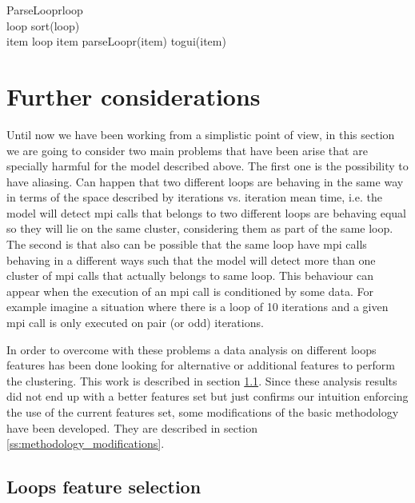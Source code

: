 \begin{pseudocode}{ParseLoopr}{loop}
\label{pc:parse_loop_func}
     \\
    loop \GETS sort(loop) \\

    \FORALL item \in loop \DO
    \BEGIN
        \IF item \in \Upsilon \THEN
            parseLoopr(item)
        \ELSE
            togui(item)
    \END
\end{pseudocode}

\section{Further considerations}\label{s:further_considerations}

Until now we have been working from a simplistic point of view, in this section
we are going to consider two main problems that have been arise that
are specially harmful for the model described above. The first one is the 
possibility to have aliasing. Can happen 
that two different loops are behaving in the same way in terms of the space
described by iterations vs. iteration mean time, i.e. the model will detect mpi
calls that belongs to two different loops are behaving equal so they will lie on
the same cluster, considering them as part of the same loop. The second
is that also can be possible that the same loop have mpi calls behaving in a
different ways such that the model will detect more than one cluster of mpi calls
that actually belongs to same loop. This behaviour can appear when the execution
of an mpi call is conditioned by some data. For example imagine a situation where 
there is a loop of 10 iterations and a given mpi call is only executed on pair 
(or odd) iterations.

In order to overcome with these problems a data analysis on different loops
features has been done looking for alternative or additional features to 
perform the clustering. This work is described in section 
\ref{ss:loops_characterzation}. Since these analysis results did not end up with
a better features set but just confirms our intuition enforcing the use of the
current features set, some modifications of
the basic methodology have been developed. They are described in section 
\ref{ss:methodology_modifications}.

\subsection{Loops feature selection}\label{ss:loops_characterzation}

